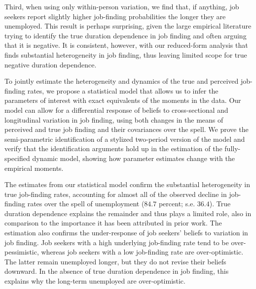 \documentclass[12pt]{article}
\theoremstyle{definition}
\begin{document}
Third, when using only within-person variation, we find that, if anything, job seekers report slightly higher job-finding probabilities the longer they are unemployed. This result is perhaps surprising, given the large empirical literature trying to identify the true duration dependence in job finding and often arguing that it is negative. It is consistent, however, with our reduced-form analysis that finds substantial heterogeneity in job finding, thus leaving limited scope for true negative duration dependence. 

To jointly estimate the heterogeneity and dynamics of the true and perceived job-finding rates, we propose a statistical model that allows us to infer the parameters of interest with exact equivalents of the moments in the data. Our model can allow for a differential response of beliefs to cross-sectional and longitudinal variation in job finding, using both changes in the means of perceived and true job finding and their covariances over the spell. We prove the semi-parametric identification of a stylized two-period version of the model and verify that the identification arguments hold up in the estimation of the fully-specified dynamic model, showing how parameter estimates change with the empirical moments. 

The estimates from our statistical model confirm the substantial heterogeneity in true job-finding rates, accounting for almost all of the observed decline in job-finding rates over the spell of unemployment ($84.7$ percent; s.e. $36.4$). True duration dependence explains the remainder and thus plays a limited role, also in comparison to the importance it has been attributed in prior work. The estimation also confirms the under-response of job seekers' beliefs to variation in job finding. Job seekers with a high underlying job-finding rate tend to be over-pessimistic, whereas job seekers with a low job-finding rate are over-optimistic. The latter remain unemployed longer, but they do not revise their beliefs downward. In the absence of true duration dependence in job finding, this explains why the long-term unemployed are over-optimistic. 
\end{document}
